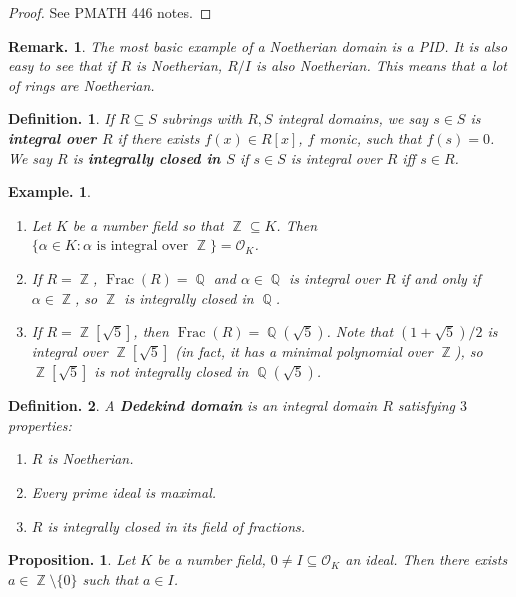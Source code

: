 \documentclass[11pt, a4paper]{memoir}
\DeclareMathOperator{\Q}{{\mathbb{Q}}}
\DeclareMathOperator{\Z}{{\mathbb{Z}}}
\theoremstyle{change}
\newtheorem{proposition}[theorem]{Proposition.}
\theoremstyle{plain}
\theoremstyle{nonumberplain}
\newtheorem{definition}{Definition.}
\newtheorem{example}{Example.}
\newtheorem{remark}{Remark.}
\newtheorem{proof}{Proof}
\DeclareMathOperator{\Frac}{Frac}
\newcommand{\mbf}[1]{{\boldmath\bfseries #1}}
\numberwithin{equation}{section}
\begin{document}
\begin{proof}
    See PMATH 446 notes.
\end{proof}
\begin{remark}
    The most basic example of a Noetherian domain is a PID.
    It is also easy to see that if $R$ is Noetherian, $R/I$ is also Noetherian.
    This means that a lot of rings are Noetherian.
\end{remark}
\begin{definition}
    If $R\subseteq S$ subrings with $R,S$ integral domains, we say $s\in S$ is \mbf{integral over $R$} if there exists $f(x)\in R[x]$, $f$ monic, such that $f(s)=0$.
    We say $R$ is \mbf{integrally closed in $S$} if $s\in S$ is integral over $R$ iff $s\in R$.
\end{definition}
\begin{example}
    \begin{enumerate}[nl]
        \item Let $K$ be a number field so that $\Z\subseteq K$.
            Then $\{\alpha\in K:\alpha\text{ is integral over }\Z\}=\mathcal{O}_K$.
        \item If $R=\Z$, $\Frac(R)=\Q$ and $\alpha\in\Q$ is integral over $R$ if and only if  $\alpha\in\Z$, so $\Z$ is integrally closed in $\Q$.

        \item If $R=\Z[\sqrt{5}]$, then $\Frac(R)=\Q(\sqrt{5})$.
            Note that $(1+\sqrt{5})/2$ is integral over $\Z[\sqrt{5}]$ (in fact, it has a minimal polynomial over $\Z$), so $\Z[\sqrt{5}]$ is not integrally closed in $\Q(\sqrt{5})$.
    \end{enumerate}
\end{example}
\begin{definition}
    A \mbf{Dedekind domain} is an integral domain $R$ satisfying $3$ properties:
    \begin{enumerate}[nolistsep]
        \item $R$ is Noetherian.
        \item Every prime ideal is maximal.
        \item $R$ is integrally closed in its field of fractions.
    \end{enumerate}
\end{definition}
\begin{proposition}\label{prop:id-scale}
    Let $K$ be a number field, $0\neq I\subseteq\mathcal{O}_K$ an ideal.
    Then there exists $a\in\Z\setminus\{0\}$ such that $a\in I$.
\end{proposition}
\end{document}
